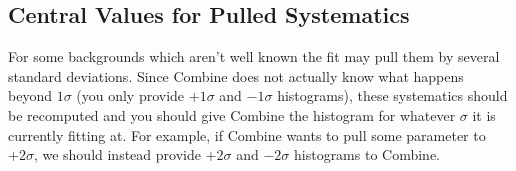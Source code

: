 \documentclass[12pt]{report}
\begin{document}
\subsection{Central Values for Pulled Systematics}
For some backgrounds which aren't well known the fit may pull them by several
standard deviations. Since Combine does not actually know what happens beyond
$1\sigma$ (you only provide $+1\sigma$ and $-1\sigma$ histograms), these
systematics should be recomputed and you should give Combine the histogram for
whatever $\sigma$ it is currently fitting at. For example, if Combine wants to
pull some parameter to $+2\sigma$, we should instead provide $+2\sigma$ and
$-2\sigma$ histograms to Combine.
\end{document}
